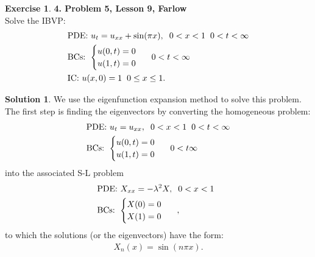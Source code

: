 \documentclass{article}
\theoremstyle{definition}
\newtheorem*{exer*}{Exercise}
\newtheorem*{sln*}{Solution}
\begin{document}
\begin{exer*}\textbf{4. Problem 5, Lesson 9, Farlow}\\
	
	Solve the IBVP:
	\begin{align*}
	&\text{PDE: } u_t = u_{xx} + \sin(\pi x), \hspace{0.2cm} 0 < x < 1\hspace{0.2cm} 0 < t < \infty\\
	&\text{BCs: }\begin{cases}
	u(0,t) = 0\\
	u(1,t) = 0
	\end{cases}\hspace{0.2cm} 0 < t < \infty\\
	&\text{IC: }u(x,0) = 1\hspace{0.2cm}0\leq x\leq 1.
	\end{align*}
	
	\begin{sln*}
		We use the eigenfunction expansion method to solve this problem. The first step is finding the eigenvectors by converting the homogeneous problem:
		\begin{align*}
		&\text{PDE: } u_t = u_{xx}, \hspace{0.2cm} 0 < x < 1\hspace{0.2cm} 0 < t < \infty\\
		&\text{BCs: }\begin{cases}
		u(0,t) = 0\\
		u(1,t) = 0
		\end{cases}\hspace{0.2cm} 0 < t  \infty
		\end{align*}
		into the associated S-L problem 
		\begin{align*}
		&\text{PDE: } X_{xx} = -\lambda^2 X, \hspace{0.2cm} 0 < x < 1\hspace{0.2cm}\\
		&\text{BCs: }\begin{cases}
		X(0) = 0\\
		X(1) = 0
		\end{cases}\hspace{0.2cm},
		\end{align*}
		to which the solutions (or the eigenvectors) have the form:
		\begin{align*}
		X_n(x) = \sin(n\pi x).
		\end{align*}
		

\end{sln*}
\end{exer*}
\end{document}
